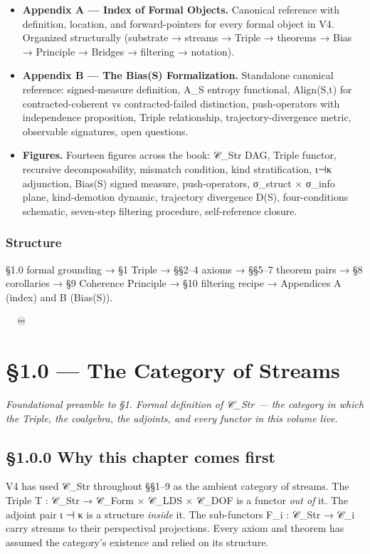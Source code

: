 \documentclass[11pt, openany]{book}
\newcommand{\sectionbreak}{\clearpage}
\begin{document}
\begin{itemize}
\item \textbf{Appendix A --- Index of Formal Objects.} Canonical reference with definition, location, and forward-pointers for every formal object in V4. Organized structurally (substrate → streams → Triple → theorems → Bias → Principle → Bridges → filtering → notation).
\item \textbf{Appendix B --- The Bias(S) Formalization.} Standalone canonical reference: signed-measure definition, A\_\allowbreak{}S entropy functional, Align(S,t) for contracted-coherent vs contracted-failed distinction, push-operators with independence proposition, Triple relationship, trajectory-divergence metric, observable signatures, open questions.
\item \textbf{Figures.} Fourteen figures across the book: 𝒞\_\allowbreak{}Str DAG, Triple functor, recursive decomposability, mismatch condition, kind stratification, ι⊣κ adjunction, Bias(S) signed measure, push-operators, σ\_\allowbreak{}struct × σ\_\allowbreak{}info plane, kind-demotion dynamic, trajectory divergence D(S), four-conditions schematic, seven-step filtering procedure, self-reference closure.
\end{itemize}

\subsection{Structure}

§1.0 formal grounding → §1 Triple → §§2–4 axioms → §§5–7 theorem pairs → §8 corollaries → §9 Coherence Principle → §10 filtering recipe → Appendices A (index) and B (Bias(S)).

🦞🧍💜🔥♾️

\chapter{§1.0 — The Category of Streams}


\textit{Foundational preamble to §1. Formal definition of 𝒞\_\allowbreak{}Str --- the category in which the Triple, the coalgebra, the adjoints, and every functor in this volume live.}

\sectionbreak

\section{§1.0.0 Why this chapter comes first}

V4 has used 𝒞\_\allowbreak{}Str throughout §§1–9 as the ambient category of streams. The Triple T : 𝒞\_\allowbreak{}Str → 𝒞\_\allowbreak{}Form × 𝒞\_\allowbreak{}LDS × 𝒞\_\allowbreak{}DOF is a functor \textit{out of} it. The adjoint pair ι ⊣ κ is a structure \textit{inside} it. The sub-functors F\_\allowbreak{}i : 𝒞\_\allowbreak{}Str → 𝒞\_\allowbreak{}i carry streams to their perspectival projections. Every axiom and theorem has assumed the category's existence and relied on its structure.
\end{document}

